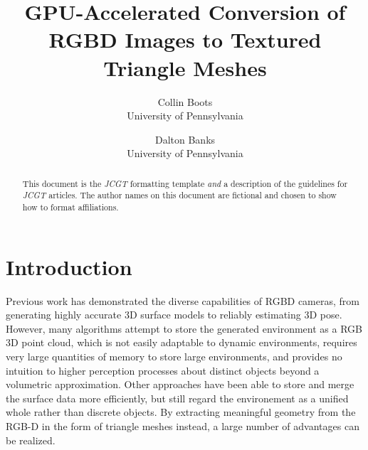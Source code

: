 \documentclass{jcgt}
\begin{document}
\title{GPU-Accelerated Conversion of RGBD Images to Textured Triangle Meshes}

\author
       {Collin Boots\\University of Pennsylvania
        \and Dalton Banks\\University of Pennsylvania
       }



\maketitle
\thispagestyle{firstpagestyle}

\begin{abstract}
\small
This document is the \textit{JCGT} formatting template \textit{and} a description of the guidelines
for  \textit{JCGT} articles.  The author names on this document are fictional and chosen to show
how to format affiliations.
\end{abstract}


\section{Introduction}
\label{sec:introduction}
Previous work has demonstrated the diverse capabilities of RGBD cameras, from generating highly accurate 3D surface models to reliably estimating 3D pose. However, many algorithms attempt to store the generated environment as a RGB 3D point cloud, which is not easily adaptable to dynamic environments, requires very large quantities of memory to store large environments, and provides no intuition to higher perception processes about distinct objects beyond a volumetric approximation. Other approaches have been able to store and merge the surface data more efficiently, but still regard the environement as a unified whole rather than discrete objects. By extracting meaningful geometry from the RGB-D in the form of triangle meshes instead, a large number of advantages can be realized.
\end{document}
